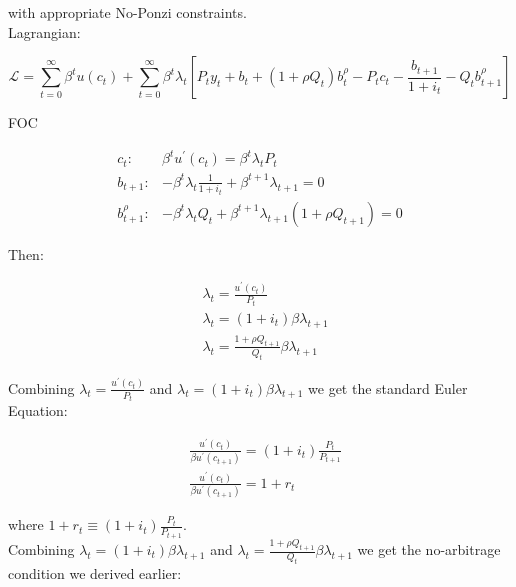 \documentclass[10pt]{article}
\begin{document}
with appropriate No-Ponzi constraints.\\
Lagrangian:

\begin{equation*}
\mathcal{L}=\sum_{t=0}^{\infty} \beta^{t} u\left(c_{t}\right)+\sum_{t=0}^{\infty} \beta^{t} \lambda_{t}\left[P_{t} y_{t}+b_{t}+\left(1+\rho Q_{t}\right) b_{t}^{\rho}-P_{t} c_{t}-\frac{b_{t+1}}{1+i_{t}}-Q_{t} b_{t+1}^{\rho}\right]
\end{equation*}

FOC

\begin{equation*}
\begin{array}{ll}
c_{t}: & \beta^{t} u^{\prime}\left(c_{t}\right)=\beta^{t} \lambda_{t} P_{t} \\
b_{t+1}: & -\beta^{t} \lambda_{t} \frac{1}{1+i_{t}}+\beta^{t+1} \lambda_{t+1}=0 \\
b_{t+1}^{\rho}: & -\beta^{t} \lambda_{t} Q_{t}+\beta^{t+1} \lambda_{t+1}\left(1+\rho Q_{t+1}\right)=0
\end{array}
\end{equation*}

Then:

\begin{equation*}
\begin{aligned}
& \lambda_{t}=\frac{u^{\prime}\left(c_{t}\right)}{P_{t}} \\
& \lambda_{t}=\left(1+i_{t}\right) \beta \lambda_{t+1} \\
& \lambda_{t}=\frac{1+\rho Q_{t+1}}{Q_{t}} \beta \lambda_{t+1}
\end{aligned}
\end{equation*}

Combining $\lambda_{t}=\frac{u^{\prime}\left(c_{t}\right)}{P_{t}}$ and $\lambda_{t}=\left(1+i_{t}\right) \beta \lambda_{t+1}$ we get the standard Euler Equation:

\begin{equation*}
\begin{aligned}
& \frac{u^{\prime}\left(c_{t}\right)}{\beta u^{\prime}\left(c_{t+1}\right)}=\left(1+i_{t}\right) \frac{P_{t}}{P_{t+1}} \\
& \frac{u^{\prime}\left(c_{t}\right)}{\beta u^{\prime}\left(c_{t+1}\right)}=1+r_{t}
\end{aligned}
\end{equation*}

where $1+r_{t} \equiv\left(1+i_{t}\right) \frac{P_{t}}{P_{t+1}}$.\\
Combining $\lambda_{t}=\left(1+i_{t}\right) \beta \lambda_{t+1}$ and $\lambda_{t}=\frac{1+\rho Q_{t+1}}{Q_{t}} \beta \lambda_{t+1}$ we get the no-arbitrage condition we derived earlier:
\end{document}
